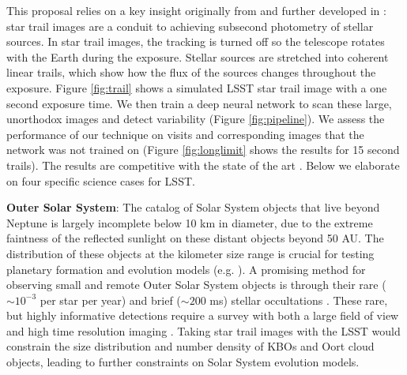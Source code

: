 \documentclass[12pt, letterpaper]{article}
\begin{document}
This proposal relies on a key insight originally from \cite{1986PASP...98..802H} and further developed in \cite{mine}: star trail images are a conduit to achieving subsecond photometry of stellar sources. In star trail images, the tracking is turned off so the telescope rotates with the Earth during the exposure. Stellar sources are stretched into coherent linear trails, which show how the flux of the sources changes throughout the exposure. Figure \ref{fig:trail} shows a simulated LSST star trail image with a one second exposure time. We then train a deep neural network to scan these large, unorthodox images and detect variability (Figure \ref{fig:pipeline}). We assess the performance of our technique on visits and corresponding images that the network was not trained on (Figure \ref{fig:longlimit} shows the results for 15 second trails). The results are competitive with the state of the art \citep{2016SPIE.9908E..0YD}. Below we elaborate on four specific science cases for LSST.


{\bf Outer Solar System}: The catalog of Solar System objects that live beyond Neptune is largely incomplete below 10 km in diameter, due to the extreme faintness of the reflected sunlight on these distant objects beyond 50 AU. The distribution of these objects at the kilometer size range is crucial for testing planetary formation and evolution models (e.g. \citealt{Kenyon04}). A promising method for observing small and remote Outer Solar System objects is through their rare ($\sim10^{-3}$ per star per year) and brief ($\sim200$ ms) stellar occultations \citep{2013AJ....146...14Z}. These rare, but highly informative detections require a survey with both a large field of view and high time resolution imaging \citep{Bianco09}. Taking star trail images with the LSST would constrain the size distribution and number density of KBOs and Oort cloud objects, leading to further constraints on Solar System evolution models.
\end{document}
